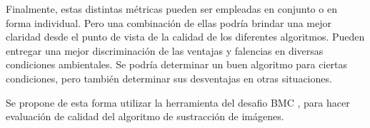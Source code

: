 Finalmente, estas distintas métricas pueden ser empleadas en conjunto o en forma individual. Pero una combinación de ellas podría brindar una mejor claridad desde el punto de vista de la calidad de los diferentes algoritmos. Pueden entregar una mejor discriminación de las ventajas y falencias en diversas condiciones ambientales. Se podría determinar un buen algoritmo para ciertas condiciones, pero también determinar sus desventajas en otras situaciones. 

Se propone de esta forma utilizar la herramienta del desafio BMC \cite{park_benchmark_2013}, para hacer evaluación de calidad del algoritmo de sustracción de imágenes.
 
 




